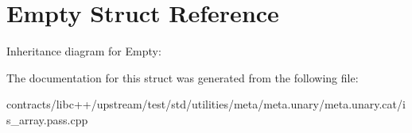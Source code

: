 \hypertarget{class_empty}{}\section{Empty Struct Reference}
\label{class_empty}


Inheritance diagram for Empty\+:


The documentation for this struct was generated from the following file\+:\begin{DoxyCompactItemize}
\item 
contracts/libc++/upstream/test/std/utilities/meta/meta.\+unary/meta.\+unary.\+cat/is\+\_\+array.\+pass.\+cpp\end{DoxyCompactItemize}
